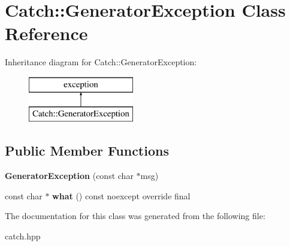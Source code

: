 \hypertarget{classCatch_1_1GeneratorException}{}\section{Catch\+::Generator\+Exception Class Reference}
\label{classCatch_1_1GeneratorException}
Inheritance diagram for Catch\+::Generator\+Exception\+:\begin{figure}[H]
\begin{center}
\leavevmode
\includegraphics[height=2.000000cm]{classCatch_1_1GeneratorException}
\end{center}
\end{figure}
\subsection*{Public Member Functions}
\begin{DoxyCompactItemize}
\item 
\mbox{\label{classCatch_1_1GeneratorException_a3cf9282d555ec32389665ce723bf36ea}} 
{\bfseries Generator\+Exception} (const char $\ast$msg)
\item 
\mbox{\label{classCatch_1_1GeneratorException_ade029163144d136f12187e5b9a0161d5}} 
const char $\ast$ {\bfseries what} () const noexcept override final
\end{DoxyCompactItemize}


The documentation for this class was generated from the following file\+:\begin{DoxyCompactItemize}
\item 
catch.\+hpp\end{DoxyCompactItemize}
